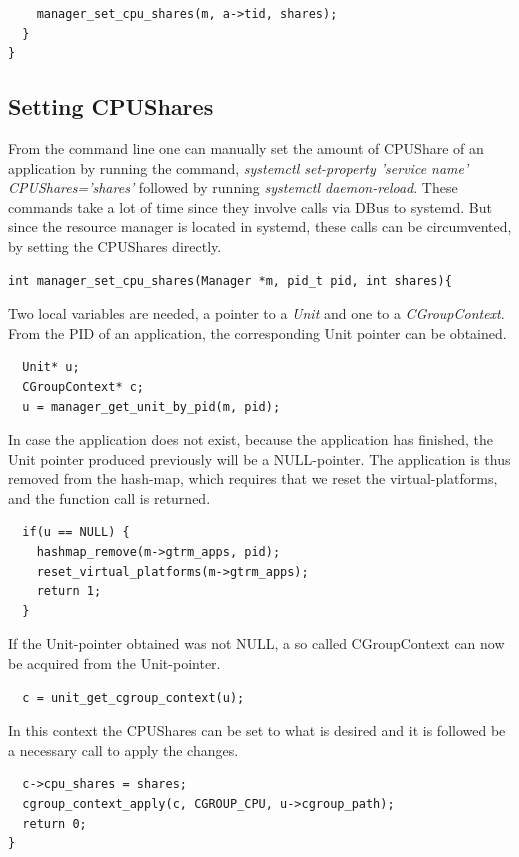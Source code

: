 \documentclass[nobiblatex]{LTHthesis}
\begin{document}
\begin{verbatim}
    manager_set_cpu_shares(m, a->tid, shares);
  }
}
\end{verbatim}
\subsection{Setting CPUShares}
From the command line one can manually set the amount of CPUShare of an application by running the command, \emph{systemctl set-property 'service name' CPUShares='shares'} followed by running \emph{systemctl daemon-reload}. These commands take a lot of time since they involve calls via DBus to systemd. But since the resource manager is located in systemd, these calls can be circumvented, by setting the CPUShares directly.
\begin{verbatim}
int manager_set_cpu_shares(Manager *m, pid_t pid, int shares){
\end{verbatim}
Two local variables are needed, a pointer to a \emph{Unit} and one to a \emph{CGroupContext}. From the PID of an application, the corresponding Unit pointer can be obtained.
\begin{verbatim}
  Unit* u;
  CGroupContext* c;
  u = manager_get_unit_by_pid(m, pid);
\end{verbatim}
In case the application does not exist, because the application has finished, the Unit pointer produced previously will be a NULL-pointer. The application is thus removed from the hash-map, which requires that we reset the virtual-platforms, and the function call is returned.
\begin{verbatim}
  if(u == NULL) {
    hashmap_remove(m->gtrm_apps, pid);
    reset_virtual_platforms(m->gtrm_apps);
    return 1;
  }
\end{verbatim}
If the Unit-pointer obtained was not NULL, a so called CGroupContext can now be acquired from the Unit-pointer.
\begin{verbatim}
  c = unit_get_cgroup_context(u);
\end{verbatim}
In this context the CPUShares can be set to what is desired and it is followed be a necessary call to apply the changes.
\begin{verbatim}
  c->cpu_shares = shares;
  cgroup_context_apply(c, CGROUP_CPU, u->cgroup_path);
  return 0;
}
\end{verbatim}
\end{document}
